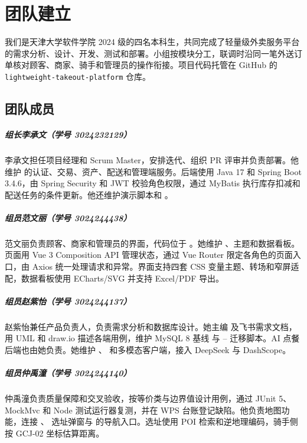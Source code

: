 \chapter{团队建立}\label{sec:report-team}

我们是天津大学软件学院 2024 级的四名本科生，共同完成了轻量级外卖服务平台的需求分析、设计、开发、测试和部署。小组按模块分工，联调时沿同一笔外送订单核对顾客、商家、骑手和管理员的操作衔接。项目代码托管在 GitHub 的 \texttt{lightweight-takeout-platform} 仓库。

\section{团队成员}

\paragraph{组长李承文（学号 3024232129）}
李承文担任项目经理和 Scrum Master，安排迭代、组织 PR 评审并负责部署。他维护  的认证、交易、资产、配送和管理端服务。后端使用 Java 17 和 Spring Boot 3.4.6，由 Spring Security 和 JWT 校验角色权限，通过 MyBatis 执行库存扣减和配送任务的条件更新。他还维护演示脚本和 。

\paragraph{组员范文丽（学号 3024244438）}
范文丽负责顾客、商家和管理员的界面，代码位于 \mbox{}。她维护 \mbox{}、主题和数据看板。页面用 Vue 3 Composition API 管理状态，通过 Vue Router 限定各角色的页面入口，由 Axios 统一处理请求和异常。界面支持四套 CSS 变量主题、转场和窄屏适配，数据看板使用 ECharts/SVG 并支持 Excel/PDF 导出。

\paragraph{组员赵紫怡（学号 3024244137）}
赵紫怡兼任产品负责人，负责需求分析和数据库设计。她主编  及飞书需求文档，用 UML 和 draw.io 描述各端用例，维护 MySQL 8 基线  与 -- 迁移脚本。AI 点餐后端也由她负责。她维护 \mbox{}、\mbox{} 和多模态客户端，接入 DeepSeek 与 DashScope。

\paragraph{组员仲禹潼（学号 3024244140）}
仲禹潼负责质量保障和交叉验收，按等价类与边界值设计用例，通过 JUnit 5、MockMvc 和 Node 测试运行器复测，并在 WPS 台账登记缺陷。他负责地图功能，连接 、 选址弹窗与  的导航入口。选址使用 POI 检索和逆地理编码，骑手侧按 GCJ-02 坐标估算距离。

